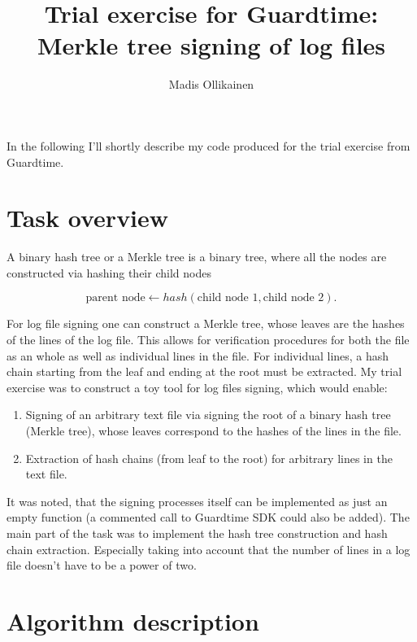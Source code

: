 \documentclass[11pt]{article}
\author{Madis Ollikainen}
\title{Trial exercise for Guardtime: Merkle tree signing of log files}
\begin{document}
\maketitle

In the following I'll shortly describe my code produced for the trial exercise from Guardtime. 

\section{Task overview} %
\label{sec:task_overview}


A binary hash tree or a Merkle tree is a binary tree, where all the nodes are constructed via hashing their child nodes

\begin{equation}
 \text{parent node} \leftarrow hash( \text{child node 1}, \text{child node 2} ). 	
\end{equation} 

For log file signing one can construct a Merkle tree, whose leaves are the hashes of the lines of the log file. This allows for verification procedures for both the file as an whole as well as individual lines in the file. For individual lines, a hash chain starting from the leaf and ending at the root must be extracted. My trial exercise was to construct a toy tool for log files signing, which would enable:  

\begin{enumerate}
  	\item Signing of an arbitrary text file via signing the root of a binary hash tree (Merkle tree), whose leaves correspond to the hashes of the lines in the file.
  	\item Extraction of hash chains (from leaf to the root) for arbitrary lines in the text file.  
\end{enumerate}  

It was noted, that the signing processes itself can be implemented as just an empty function (a commented call to Guardtime SDK could also be added). The main part of the task was to implement the hash tree construction and hash chain extraction. Especially taking into account that the number of lines in a log file doesn't have to be a power of two. 


\section{Algorithm description} %
\label{sec:algorithm_description}
\end{document}
